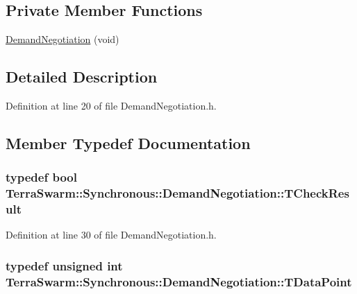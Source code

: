 \subsection*{Private Member Functions}
\begin{DoxyCompactItemize}
\item 
\hyperlink{class_terra_swarm_1_1_synchronous_1_1_demand_negotiation_a9477added06c203f17f43cbfbd651fc4}{Demand\-Negotiation} (void)
\end{DoxyCompactItemize}


\subsection{Detailed Description}


Definition at line 20 of file Demand\-Negotiation.\-h.



\subsection{Member Typedef Documentation}
\hypertarget{class_terra_swarm_1_1_synchronous_1_1_demand_negotiation_abf70719cd7b70d3eeecb1949bc2157a3}{
\subsubsection[{T\-Check\-Result}]{\setlength{\rightskip}{0pt plus 5cm}typedef bool {\bf Terra\-Swarm\-::\-Synchronous\-::\-Demand\-Negotiation\-::\-T\-Check\-Result}}}\label{class_terra_swarm_1_1_synchronous_1_1_demand_negotiation_abf70719cd7b70d3eeecb1949bc2157a3}


Definition at line 30 of file Demand\-Negotiation.\-h.

\hypertarget{class_terra_swarm_1_1_synchronous_1_1_demand_negotiation_a6660353fa0a65775070bba8571a76e3d}{
\subsubsection[{T\-Data\-Point}]{\setlength{\rightskip}{0pt plus 5cm}typedef unsigned int {\bf Terra\-Swarm\-::\-Synchronous\-::\-Demand\-Negotiation\-::\-T\-Data\-Point}}}\label{class_terra_swarm_1_1_synchronous_1_1_demand_negotiation_a6660353fa0a65775070bba8571a76e3d}


